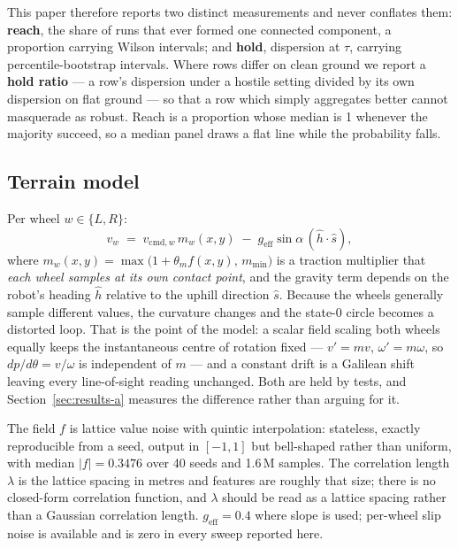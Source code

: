 \documentclass[11pt,a4paper]{article}
\begin{document}
This paper therefore reports two distinct measurements and never conflates them:
\textbf{reach}, the share of runs that ever formed one connected component, a
proportion carrying Wilson intervals; and \textbf{hold}, dispersion at $\tau$,
carrying percentile-bootstrap intervals. Where rows differ on clean ground we
report a \textbf{hold ratio} --- a row's dispersion under a hostile setting
divided by its own dispersion on flat ground --- so that a row which simply
aggregates better cannot masquerade as robust. Reach is a proportion whose median is 1 whenever
the majority succeed, so a median panel draws a flat line while the probability
falls.

\subsection{Terrain model}

Per wheel $w \in \{L, R\}$:
\begin{equation}
v_w \;=\; v_{\mathrm{cmd},w}\, m_w(x,y) \;-\; g_{\mathrm{eff}}\sin\alpha\,
(\hat h \cdot \hat s),
\label{eq:terrain}
\end{equation}
where $m_w(x,y) = \max\!\big(1 + \theta_m f(x,y),\, m_{\min}\big)$ is a traction
multiplier that \emph{each wheel samples at its own contact point}, and the
gravity term depends on the robot's heading $\hat h$ relative to the uphill
direction $\hat s$. Because the wheels generally sample different values, the
curvature changes and the state-0 circle becomes a distorted loop. That is the
point of the model: a scalar field scaling both wheels equally keeps the
instantaneous centre of rotation fixed --- $v' = mv$, $\omega' = m\omega$, so
$dp/d\theta = v/\omega$ is independent of $m$ --- and a constant drift is a
Galilean shift leaving every line-of-sight reading unchanged. Both are held by
tests, and Section~\ref{sec:results-a} measures the difference rather than
arguing for it.

The field $f$ is lattice value noise with quintic interpolation: stateless,
exactly reproducible from a seed, output in $[-1,1]$ but bell-shaped rather than
uniform, with median $|f| = 0.3476$ over 40 seeds and 1.6\,M samples. The
correlation length $\lambda$ is the lattice spacing in metres and features are
roughly that size; there is no closed-form correlation function, and $\lambda$
should be read as a lattice spacing rather than a Gaussian correlation length.
$g_{\mathrm{eff}} = 0.4$ where slope is used; per-wheel slip noise is available
and is zero in every sweep reported here.
\end{document}
